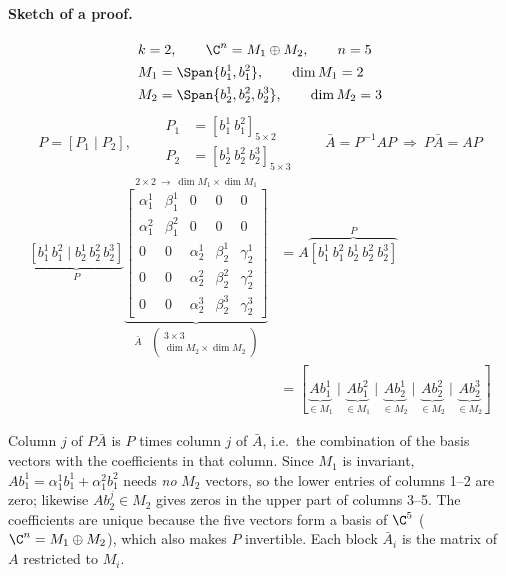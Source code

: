 \paragraph{Sketch of a proof.}
\begin{align*}
&k=2,\qquad \C^n=M_1\oplus M_2,\qquad n=5\\
&M_1=\Span\{b_1^1,b_1^2\},\qquad\dim M_1=2\\
&M_2=\Span\{b_2^1,b_2^2,b_2^3\},\qquad\dim M_2=3
\end{align*}
\[
P=[P_1\mid P_2],\qquad
\begin{aligned}
P_1&=[b_1^1\ b_1^2]_{5\times2}\\
P_2&=[b_2^1\ b_2^2\ b_2^3]_{5\times3}
\end{aligned}
\qquad
\bar{A}=P^{-1}AP\ \Rightarrow\ P\bar{A}=AP
\]
\begin{align*}
\underbrace{[b_1^1\,b_1^2\mid b_2^1\,b_2^2\,b_2^3]}_{P}
\underbrace{\overset{2\times2\ \to\ \dim M_1\times\dim M_1}{\left[\begin{array}{cc|ccc}
\alpha_1^1&\beta_1^1&0&0&0\\
\alpha_1^2&\beta_1^2&0&0&0\\\hline
0&0&\alpha_2^1&\beta_2^1&\gamma_2^1\\
0&0&\alpha_2^2&\beta_2^2&\gamma_2^2\\
0&0&\alpha_2^3&\beta_2^3&\gamma_2^3
\end{array}\right]}}_{\bar{A}\quad\left(\substack{3\times3\\ \dim M_2\times\dim M_2}\right)}
&=A\overbrace{[b_1^1\ b_1^2\ b_2^1\ b_2^2\ b_2^3]}^{P}\\
&=[\underbrace{Ab_1^1}_{\in M_1}\mid\underbrace{Ab_1^2}_{\in M_1}\mid\underbrace{Ab_2^1}_{\in M_2}\mid\underbrace{Ab_2^2}_{\in M_2}\mid\underbrace{Ab_2^3}_{\in M_2}]
\end{align*}
\begin{insight}
Column $j$ of $P\bar A$ is $P$ times column $j$ of $\bar A$, i.e.\ the combination of the basis vectors with the coefficients in that column. Since $M_1$ is invariant, $Ab_1^1=\alpha_1^1b_1^1+\alpha_1^2b_1^2$ needs \emph{no} $M_2$ vectors, so the lower entries of columns 1--2 are zero; likewise $Ab_2^j\in M_2$ gives zeros in the upper part of columns 3--5. The coefficients are unique because the five vectors form a basis of $\C^5$ ($\C^n=M_1\oplus M_2$), which also makes $P$ invertible. Each block $\bar A_i$ is the matrix of $A$ restricted to $M_i$.
\end{insight}


